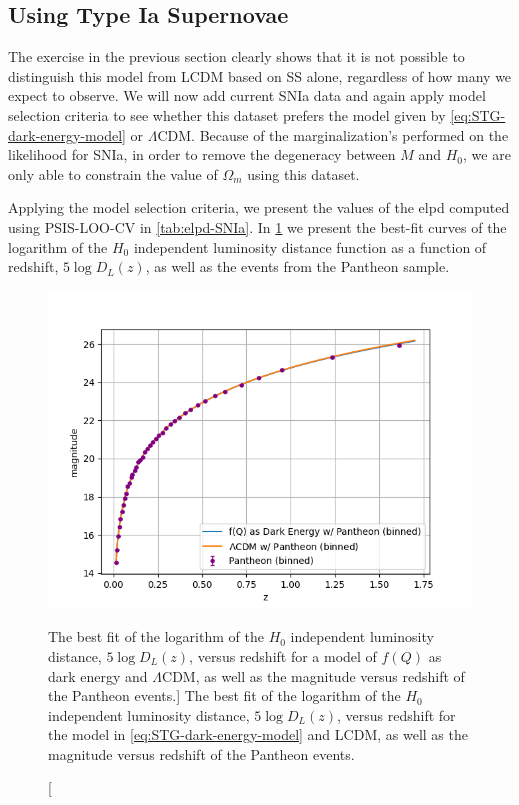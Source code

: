 \subsection{Using Type Ia Supernovae}
\label{subsec:data-from-SNIa}

The exercise in the previous section clearly shows that it is not possible to distinguish this model from \gls{LCDM} based on \gls{SS} alone, regardless of how many we expect to observe. We will now add current \gls{SNIa} data and again apply model selection criteria to see whether this dataset prefers the model given by \cref{eq:STG-dark-energy-model} or $\Lambda$CDM. Because of the marginalization's performed on the likelihood for \gls{SNIa}, in order to remove the degeneracy between $M$ and $H_0$, we are only able to constrain the value of $\Omega_m$ using this dataset.

Applying the model selection criteria, we present the values of the \gls{elpd} computed using \gls{PSIS-LOO-CV} in \cref{tab:elpd-SNIa}. In \cref{fig:SNIa-fotisvsLCDM.png} we present the best-fit curves of the logarithm of the $H_0$ independent luminosity distance function as a function of redshift, $5 \log {D_L(z)}$, as well as the events from the Pantheon sample.

\begin{figure}[h!]
    \centering
    \includegraphics[width=0.7\columnwidth]{figures/SNIa-fotisvsLCDM.png}
    \caption
    [The best fit of the logarithm of the $H_0$ independent luminosity distance, $5 \log{D_L(z)}$, versus redshift for a model of $f(Q)$ as dark energy and $\Lambda$CDM, as well as the magnitude versus redshift of the Pantheon events.]
    {The best fit of the logarithm of the $H_0$ independent luminosity distance, $5 \log{D_L(z)}$, versus redshift for the model in \cref{eq:STG-dark-energy-model} and \gls{LCDM}, as well as the magnitude versus redshift of the Pantheon events.}
    \label{fig:SNIa-fotisvsLCDM.png}
\end{figure}

